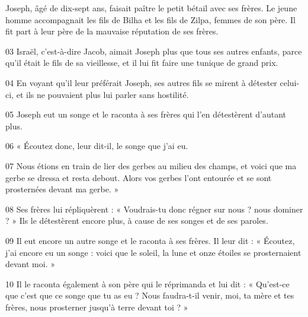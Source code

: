 Joseph, âgé de dix-sept ans, faisait paître le petit bétail avec ses frères. Le jeune homme accompagnait les fils de Bilha et les fils de Zilpa, femmes de son père. Il fit part à leur père de la mauvaise réputation de ses frères.

03 Israël, c’est-à-dire Jacob, aimait Joseph plus que tous ses autres enfants, parce qu’il était le fils de sa vieillesse, et il lui fit faire une tunique de grand prix.

04 En voyant qu’il leur préférait Joseph, ses autres fils se mirent à détester celui-ci, et ils ne pouvaient plus lui parler sans hostilité.

05 Joseph eut un songe et le raconta à ses frères qui l’en détestèrent d’autant plus.

06 « Écoutez donc, leur dit-il, le songe que j’ai eu.

07 Nous étions en train de lier des gerbes au milieu des champs, et voici que ma gerbe se dressa et resta debout. Alors vos gerbes l’ont entourée et se sont prosternées devant ma gerbe. »

08 Ses frères lui répliquèrent : « Voudrais-tu donc régner sur nous ? nous dominer ? » Ils le détestèrent encore plus, à cause de ses songes et de ses paroles.

09 Il eut encore un autre songe et le raconta à ses frères. Il leur dit : « Écoutez, j’ai encore eu un songe : voici que le soleil, la lune et onze étoiles se prosternaient devant moi. »

10 Il le raconta également à son père qui le réprimanda et lui dit : « Qu’est-ce que c’est que ce songe que tu as eu ? Nous faudra-t-il venir, moi, ta mère et tes frères, nous prosterner jusqu’à terre devant toi ? »